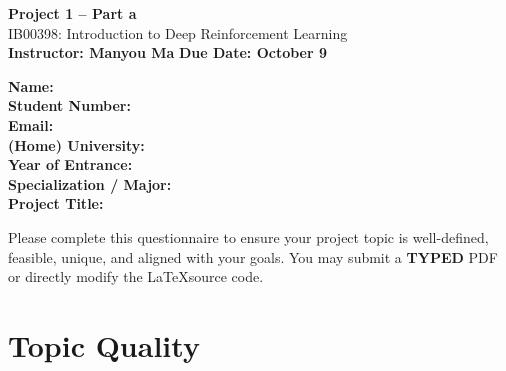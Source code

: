 \documentclass[12pt,a4paper]{article}
\begin{document}
\begin{center}
    {\LARGE \textbf{Project 1 – Part a}} \\[6pt]
    {\large IB00398: Introduction to Deep Reinforcement Learning} \\[3pt]
    \textbf{Instructor: Manyou Ma} \quad \textbf{Due Date: October 9}\\ [3pt]
\end{center}

\vspace{1em}

\noindent

\begin{tcolorbox}[colback=white,colframe=black,boxrule=0.6pt,arc=2pt]
\textbf{Name:} \hspace{8cm} \\[6pt]
\textbf{Student Number:} \hspace{6cm} \\[6pt]
\textbf{Email:} \hspace{8.2cm} \\[6pt]
\textbf{(Home) University:} \hspace{6.5cm} \\[6pt]
\textbf{Year of Entrance:} \hspace{6.5cm} \\[6pt]
\textbf{Specialization / Major:} \hspace{5.6cm} \\[6pt]
\textbf{Project Title:} \hspace{7.2cm}
\end{tcolorbox}

\vspace{1em}
\noindent
Please complete this questionnaire to ensure your project topic is well-defined, feasible, unique, and aligned with your goals. You may submit a \textbf{TYPED} PDF or directly modify the \LaTeX source code.  





\section*{Topic Quality}
\end{document}
